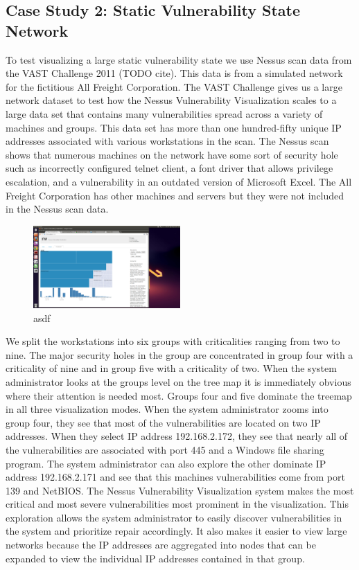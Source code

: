 \documentclass{acm_proc_article-sp}
\begin{document}
\subsection{Case Study 2: Static Vulnerability State Network }
To test visualizing a large static vulnerability state we use Nessus scan data from
the VAST Challenge 2011 (TODO cite). This data is from a simulated network for the
fictitious All Freight Corporation. The VAST Challenge gives us a large network
dataset to test how the Nessus Vulnerability Visualization scales to a large
data set that contains many vulnerabilities spread across a variety of machines and
groups. This data set has more than one
hundred-fifty unique IP addresses associated with various workstations in the
scan. The Nessus scan shows that numerous
machines on the network have some sort of security hole such as incorrectly
configured telnet client, a font driver that allows privilege escalation, and a
vulnerability in an outdated version of Microsoft Excel. The All Freight
Corporation has other machines and servers but they were not included in the
Nessus scan data.

\begin{figure}
  \centering
  \includegraphics[width=0.5\textwidth]{../screenshots/final/VastGroup}
  \caption{asdf}
\end{figure}

We split the workstations into six groups with criticalities ranging from two to
nine.  The major security holes in the group are concentrated in group four with a
criticality of nine and in group five with a criticality of two.  When the
system administrator looks at the groups level on the tree map it is immediately
obvious where their attention is needed most. Groups four and five dominate the
treemap in all three visualization modes. When the system administrator zooms
into group four, they see that most of the vulnerabilities are located on two IP
addresses. When they select IP address 192.168.2.172, they see that nearly all of
the vulnerabilities are associated with port 445 and a Windows file sharing
program. The system administrator can also explore the other dominate IP address 192.168.2.171 and
see that this machines vulnerabilities come from port 139 and NetBIOS. The
Nessus Vulnerability Visualization system makes the most critical and most
severe vulnerabilities most prominent in the visualization. This
exploration allows the system administrator to easily discover vulnerabilities
in the system and prioritize repair accordingly. It also makes it easier to view large
networks because the IP addresses are aggregated into nodes that can be expanded to view
the individual IP addresses contained in that group.
\end{document}

